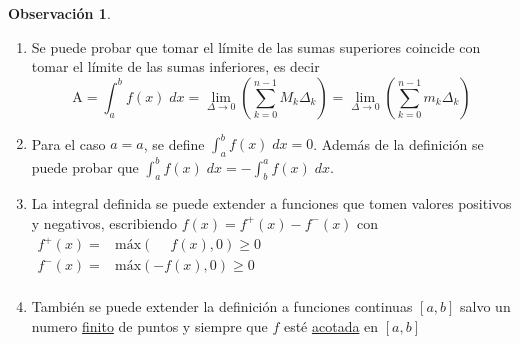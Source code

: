 \documentclass{article}
\theoremstyle{definition}
\theoremstyle{definition}
\newtheorem*{obs}{Observación}
\theoremstyle{remark}
\begin{document}
\begin{obs} \; \\
    \begin{enumerate}
      \item Se puede probar que tomar el límite de las sumas superiores coincide con tomar el límite de las sumas inferiores, es decir
      \[
    \text{A} =\int_{a}^{b}{f(x)\; dx}= \lim_{\Delta \to 0}\left( \sum_{k=0}^{n-1}{M_k\Delta_k}\right)=\lim_{\Delta \to 0}\left( \sum_{k=0}^{n-1}{m_k\Delta_k}\right)
      \]
      \item Para el caso $a=a$, se define $\int_{a}^{b}{f(x)\;dx}=0$. Además de la definición se puede probar que $\int_{a}^{b}f(x)\; dx=-\int_{b}^{a}{f(x)\;dx}$.
      \item La integral definida se puede extender a funciones que tomen valores positivos y negativos, escribiendo $f(x)=f^+(x)-f^-(x)$ con $\begin{array}{lcl}
f^+(x)= & \text{máx}  (\phantom{-}f(x),0) \geq 0 \\
f^-(x)= & \text{máx}  (-f(x),0) \geq 0 \\
  \end{array}$\\


  \begin{figure}[h]
      \centering
      \quad \quad \quad \quad
  \end{figure}
  \pagebreak
      \item También se puede extender la definición a funciones continuas $[a,b]$ salvo un numero \underline{finito} de puntos y siempre que $f$ esté \underline{acotada} en $[a,b]$

      \begin{figure}[h]
      \centering
      \def\svgwidth{0.55\textwidth}
      
      \end{figure}
\end{enumerate}
\end{obs}
\end{document}
